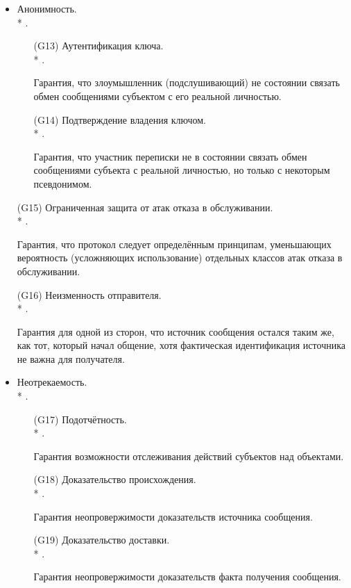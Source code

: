 \begin{itemize}
	\item Анонимность.\\*
		.
	\begin{itemize}
		\item[(G13)] Аутентификация ключа.\\*
			.
		\item[{}] Гарантия, что злоумышленник (подслушивающий) не состоянии связать обмен сообщениями субъектом с его реальной личностью.
		\item[(G14)] Подтверждение владения ключом.\\*
			.
		\item[{}] Гарантия, что участник переписки не в состоянии связать обмен сообщениями субъекта с реальной личностью, но только с некоторым псевдонимом.
	\end{itemize}

	\item[(G15)] Ограниченная защита от атак отказа в обслуживании.\\*
		.
	\item[{}] Гарантия, что протокол следует определённым принципам, уменьшающих вероятность (усложняющих использование) отдельных классов атак отказа в обслуживании.

	\item[(G16)] Неизменность отправителя.\\*
		.
	\item[{}] Гарантия для одной из сторон, что источник сообщения остался таким же, как тот, который начал общение, хотя фактическая идентификация источника не важна для получателя.

	\item Неотрекаемость.\\*
		.
	\begin{itemize}
		\item[(G17)] Подотчётность.\\*
			.
		\item[{}] Гарантия возможности отслеживания действий субъектов над объектами.
		\item[(G18)] Доказательство происхождения.\\*
			.
		\item[{}] Гарантия неопровержимости доказательств источника сообщения.
		\item[(G19)] Доказательство доставки.\\*
			.
		\item[{}] Гарантия неопровержимости доказательств факта получения сообщения.
	\end{itemize}


\end{itemize}
